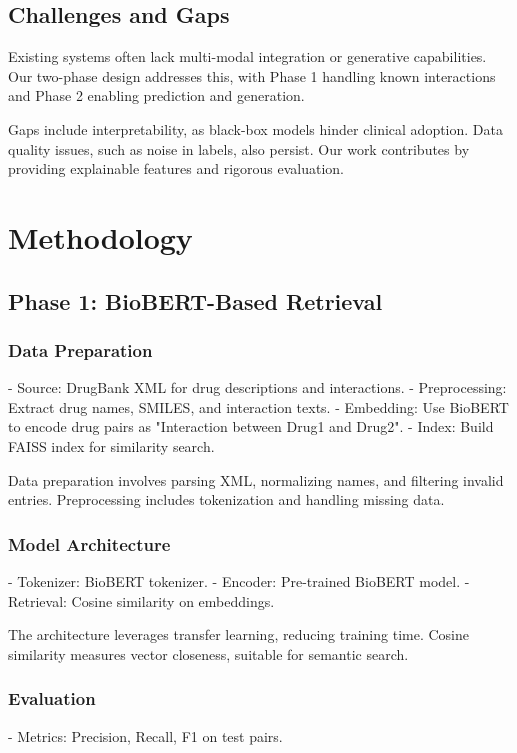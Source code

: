 \documentclass[12pt,a4paper]{article}
\begin{document}
\subsection{Challenges and Gaps}
Existing systems often lack multi-modal integration or generative capabilities. Our two-phase design addresses this, with Phase 1 handling known interactions and Phase 2 enabling prediction and generation.

Gaps include interpretability, as black-box models hinder clinical adoption. Data quality issues, such as noise in labels, also persist. Our work contributes by providing explainable features and rigorous evaluation.

\section{Methodology}
\label{sec:method}

\subsection{Phase 1: BioBERT-Based Retrieval}
\subsubsection{Data Preparation}
- Source: DrugBank XML for drug descriptions and interactions.
- Preprocessing: Extract drug names, SMILES, and interaction texts.
- Embedding: Use BioBERT to encode drug pairs as "Interaction between Drug1 and Drug2".
- Index: Build FAISS index for similarity search.

Data preparation involves parsing XML, normalizing names, and filtering invalid entries. Preprocessing includes tokenization and handling missing data.

\subsubsection{Model Architecture}
- Tokenizer: BioBERT tokenizer.
- Encoder: Pre-trained BioBERT model.
- Retrieval: Cosine similarity on embeddings.

The architecture leverages transfer learning, reducing training time. Cosine similarity measures vector closeness, suitable for semantic search.

\subsubsection{Evaluation}
- Metrics: Precision, Recall, F1 on test pairs.
\end{document}
